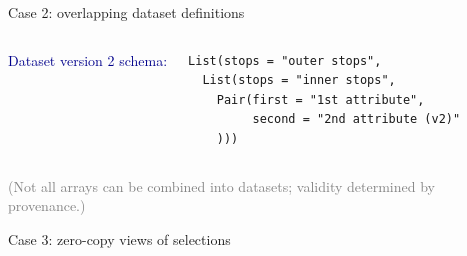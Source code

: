\documentclass[aspectratio=169]{beamer}
\begin{document}
\begin{frame}[fragile]{Case 2: overlapping dataset definitions}
\begin{columns}[t]
\vspace{0.5 cm}
\textcolor{darkblue}{Dataset version 2 schema:}
{\scriptsize
\begin{verbatim}
List(stops = "outer stops",
  List(stops = "inner stops",
    Pair(first = "1st attribute",
         second = "2nd attribute (v2)"
    )))
\end{verbatim}}
\end{columns}

\vspace{-0.25 cm}
\textcolor{gray}{(Not all arrays can be combined into datasets; validity determined by provenance.)}
\end{frame}

\begin{frame}{Case 3: zero-copy views of selections}
\vspace{0.75 cm}


\end{frame}
\end{document}
